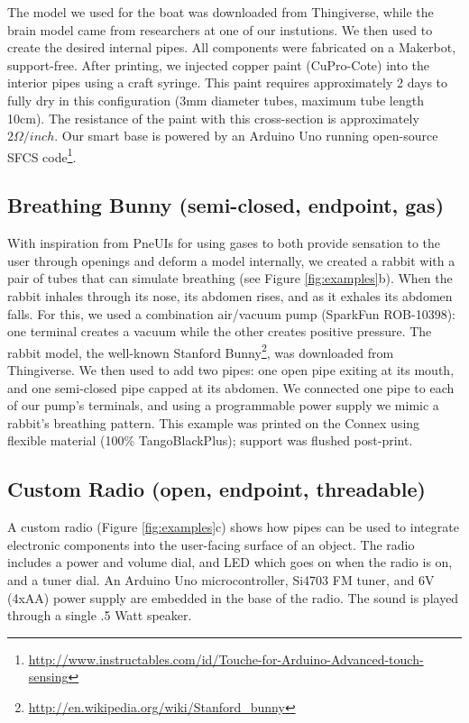 The model we used for the boat was downloaded from Thingiverse, while the brain model came from researchers at one of our instutions. We then used \systemname to create the desired internal pipes. All components were fabricated on a Makerbot, support-free.  After printing, we injected copper paint (CuPro-Cote) into the interior pipes using a craft syringe.  This paint requires approximately 2 days to fully dry in this configuration (3mm diameter tubes, maximum tube length 10cm).  The resistance of the paint with this cross-section is approximately $2\Omega / inch.$  Our smart base is powered by an Arduino Uno running open-source SFCS code\footnote{\url{http://www.instructables.com/id/Touche-for-Arduino-Advanced-touch-sensing}}.

\subsection{Breathing Bunny (semi-closed, endpoint, gas)}

With inspiration from PneUIs \cite{Yao-pneui} for using gases to both provide sensation to the user through openings and deform a model internally, we created a rabbit with a pair of tubes that can simulate breathing (see Figure \ref{fig:examples}b).  When the rabbit inhales through its nose, its abdomen rises, and as it exhales its abdomen falls.  For this, we used a combination air/vacuum pump (SparkFun ROB-10398): one terminal creates a vacuum while the other creates positive pressure.  
The rabbit model, the well-known Stanford Bunny\footnote{\url{http://en.wikipedia.org/wiki/Stanford_bunny}}, was downloaded from Thingiverse. We then used \systemname to add two pipes: one open pipe exiting at its mouth, and one semi-closed pipe capped at its abdomen.  We connected one pipe to each of our pump's terminals, and using a programmable power supply we mimic a rabbit's breathing pattern.  This example was printed on the Connex using flexible material (100\% TangoBlackPlus); support was flushed post-print.

\subsection{Custom Radio (open, endpoint, threadable)}
A custom radio (Figure \ref{fig:examples}c) shows how pipes can be used to integrate electronic components into the user-facing surface of an object. The radio includes a power and volume dial, and LED which goes on when the radio is on, and a tuner dial. An Arduino Uno microcontroller, Si4703 FM tuner, and 6V (4xAA) power supply are embedded in the base of the radio. The sound is played through a single .5 Watt speaker. %

